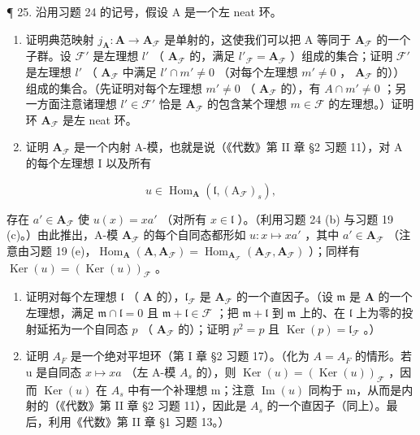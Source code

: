 ¶ 25. 沿用习题 24 的记号，假设 A 是一个左 neat 环。

\begin{enumerate}
\def\labelenumi{(\alph{enumi})}
\item
  证明典范映射 \(j_{\mathbf{A}}: \mathbf{A} \to \mathbf{A}_{\mathcal{F}}\) 是单射的，这使我们可以把 A 等同于 \(\mathbf{A}_{\mathcal{F}}\) 的一个子群。设 \(\mathcal{F}'\) 是左理想 \(l'\) （ \(\mathbf{A}_{\mathcal{F}}\) 的，满足 \(l'_{\mathcal{F}} = \mathbf{A}_{\mathcal{F}}\) ）组成的集合；证明 \(\mathcal{F}'\) 是左理想 \(l'\) （ \(\mathbf{A}_{\mathcal{F}}\) 中满足 \(l' \cap m' \neq 0\) （对每个左理想 \(m' \neq 0\) ， \(\mathbf{A}_{\mathcal{F}}\) 的））组成的集合。（先证明对每个左理想 \(m' \neq 0\) （ \(\mathbf{A}_{\mathcal{F}}\) 的），有 \(A \cap m' \neq 0\) ；另一方面注意诸理想 \(l' \in \mathcal{F}'\) 恰是 \(\mathbf{A}_{\mathcal{F}}\) 的包含某个理想 \(m \in \mathcal{F}\) 的左理想。）证明环 \(\mathbf{A}_{\mathcal{F}}\) 是左 neat 环。
\item
  证明 \(\mathbf{A}_{\mathcal{F}}\) 是一个内射 A-模，也就是说（《代数》第 II 章 §2 习题 11），对 A 的每个左理想 I 以及所有
\end{enumerate}

\[
u \in \operatorname{Hom} _ {\mathbf {A}} (\mathfrak {l}, (\mathrm{A} _ {\mathcal {F}}) _ {s}),
\]

存在 \(a' \in \mathbf{A}_{\mathcal{F}}\) 使 \(u(x) = xa'\) （对所有 \(x \in \mathfrak{l}\) ）。（利用习题 24 (b) 与习题 19 (c)。）由此推出，A-模 \(\mathbf{A}_{\mathcal{F}}\) 的每个自同态都形如 \(u: x \mapsto xa'\) ，其中 \(a' \in \mathbf{A}_{\mathcal{F}}\) （注意由习题 19 (e)，\(\operatorname{Hom}_{\mathbf{A}}(\mathbf{A}, \mathbf{A}_{\mathcal{F}}) = \operatorname{Hom}_{\mathbf{A}_{\mathcal{F}}}(\mathbf{A}_{\mathcal{F}}, \mathbf{A}_{\mathcal{F}})\) ）；同样有 \(\operatorname{Ker}(u) = (\operatorname{Ker}(u))_{\mathcal{F}}\) 。

\begin{enumerate}
\def\labelenumi{(\alph{enumi})}
\setcounter{enumi}{2}
\item
  证明对每个左理想 \(\mathfrak{l}\) （ \(\mathbf{A}\) 的），\(\mathfrak{l}_{\mathcal{F}}\) 是 \(\mathbf{A}_{\mathcal{F}}\) 的一个直因子。（设 \(\mathfrak{m}\) 是 \(\mathbf{A}\) 的一个左理想，满足 \(\mathfrak{m} \cap \mathfrak{l} = 0\) 且 \(\mathfrak{m} + \mathfrak{l} \in \mathcal{F}\) ；把 \(\mathfrak{m} + \mathfrak{l}\) 到 \(\mathfrak{m}\) 上的、在 \(\mathfrak{l}\) 上为零的投射延拓为一个自同态 \(p\) （ \(\mathbf{A}_{\mathcal{F}}\) 的）；证明 \(p^2 = p\) 且 \(\operatorname{Ker}(p) = \mathfrak{l}_{\mathcal{F}}\) 。）
\item
  证明 \(A_{F}\) 是一个绝对平坦环（第 I 章 §2 习题 17）。（化为 \(A = A_{F}\) 的情形。若 u 是自同态 \(x \mapsto xa\) （左 A-模 \(A_{s}\) 的），则 \(\operatorname{Ker}(u) = (\operatorname{Ker}(u))_{\mathcal{F}}\) ，因而 \(\operatorname{Ker}(u)\) 在 \(A_{s}\) 中有一个补理想 m；注意 \(\operatorname{Im}(u)\) 同构于 m，从而是内射的（《代数》第 II 章 §2 习题 11），因此是 \(A_{s}\) 的一个直因子（同上）。最后，利用《代数》第 II 章 §1 习题 13。）
\end{enumerate}

